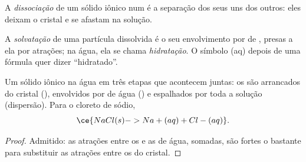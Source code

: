 \begin{definition}[Dissociação]\label{def:g11:dissolution:dissociation}
A \emph{dissociação} de um sólido iônico num 
é a separação dos seus  uns dos outros: eles deixam o cristal e se
afastam na solução.
\end{definition}

\begin{definition}\label{def:g11:dissolution:solvation}
A \emph{solvatação} de uma partícula dissolvida é o seu
envolvimento por  de , presas a ela por atrações; na
água, ela se chama \emph{hidratação}. O símbolo (aq)
depois de uma fórmula quer dizer ``hidratado''.
\end{definition}

\begin{proposition}\label{prop:g11:dissolution:stages}
Um sólido iônico  na água em três etapas que acontecem
juntas: os  são arrancados do cristal (), envolvidos por
 de água () e espalhados por toda a solução
(dispersão). Para o cloreto de sódio,
\[
  \ce{NaCl(s) -> Na+(aq) + Cl-(aq)} .
\]
\end{proposition}

\begin{proof}
Admitido: as atrações entre os  e as  de água,
somadas, são fortes o bastante para substituir as atrações entre os 
do cristal.
\end{proof}

